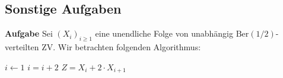 \subsection*{Sonstige Aufgaben}

\begin{comment}
	\textbf{Aufgabe}
	Es werden ein blauer und ein grüner Würfel geworfen. Wir wählen $\Omega = \{1,...,6\}^2$. Wir betrachten die Algebra:
	$$\F_{\text{sym}} = \{ A \subseteq \Omega \; | \; \forall (\omega_1, \omega_2) \in \Omega, (\omega_1, \omega_2) \in A \Leftrightarrow (\omega_2, \omega_1) \in A  \}$$
	Zeige, dass $\F_{\text{sym}}$ eine $\sigma$-Algebra ist. \medskip


	Wir müssen 3 Eigenschaften überprüfen. 
	\begin{enumerate}
		\item $\forall (\omega_1, \omega_2) \in \Omega \Leftrightarrow (\omega_2, \omega_1) \in \Omega$ daher gilt $\Omega \in \F_{\text{sym}}$.
		\item Sei $A \in \F_{\text{sym}}$. Somit gilt für jedes $(\omega_1, \omega_2) \in \Omega$
			$$(\omega_1, \omega_2) \in A \Leftrightarrow (\omega_2, \omega_1) \in \Omega$$
			was äquivalent ist zu
			$$(\omega_1, \omega_2) \in A^\complement \Leftrightarrow (\omega_2, \omega_1) \in A^\complement$$
			somit ist $A^\complement \in \F_{\text{sym}}$.
		\item Seien $A_1, A_2, ... \in \F_{\text{sym}}$ gilt:
			\begin{align*}
				(\omega_1, \omega_2) \in \cup_{i=1}^\infty A_i &\Leftrightarrow \exists i. (\omega_1, \omega_2) \in A_i \\
				&\Leftrightarrow \exists i. (\omega_2, \omega_1) \in A_i \\
				&\Leftrightarrow (\omega_2, \omega_1) \in \cup_{i=1}^\infty A_i
			\end{align*}
			Somit folgt $\cup_{i=1}^\infty A_i \in \F_{\text{sym}}$.
	\end{enumerate}

	\hrulefill
\end{comment}

\textbf{Aufgabe}
Sei $(X_i)_{i \geq 1}$ eine unendliche Folge von unabhängig $\text{Ber}(1/2)$-verteilten ZV. Wir betrachten folgenden Algorithmus:

\begin{algorithmic}
	\State $i \gets 1$
		\State $i = i + 2$
	\EndWhile
	\State \Return $Z = X_i + 2 \cdot X_{i+1}$
\end{algorithmic}

